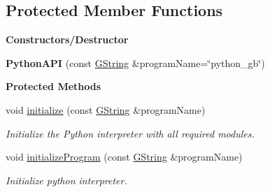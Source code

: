 \subsection*{Protected Member Functions}
\begin{Indent}\textbf{ Constructors/\+Destructor}\par
\begin{DoxyCompactItemize}
\item 
\mbox{\label{classrev_1_1_python_a_p_i_a75e8fccb8835ce2ef18bfcf54b2b23c9}} 
{\bfseries Python\+A\+PI} (const \mbox{\hyperlink{classrev_1_1_g_string}{G\+String}} \&program\+Name=\char`\"{}python\+\_\+gb\char`\"{})
\end{DoxyCompactItemize}
\end{Indent}
\begin{Indent}\textbf{ Protected Methods}\par
\begin{DoxyCompactItemize}
\item 
\mbox{\label{classrev_1_1_python_a_p_i_a15a99b5af9aae28bb4384d525feef31e}} 
void \mbox{\hyperlink{classrev_1_1_python_a_p_i_a15a99b5af9aae28bb4384d525feef31e}{initialize}} (const \mbox{\hyperlink{classrev_1_1_g_string}{G\+String}} \&program\+Name)
\begin{DoxyCompactList}\small\item\em Initialize the Python interpreter with all required modules. \end{DoxyCompactList}\item 
\mbox{\label{classrev_1_1_python_a_p_i_a9c429146bc6280a82c49122dc680c34c}} 
void \mbox{\hyperlink{classrev_1_1_python_a_p_i_a9c429146bc6280a82c49122dc680c34c}{initialize\+Program}} (const \mbox{\hyperlink{classrev_1_1_g_string}{G\+String}} \&program\+Name)
\begin{DoxyCompactList}\small\item\em Initialize python interpreter. \end{DoxyCompactList}\end{DoxyCompactItemize}
\end{Indent}
